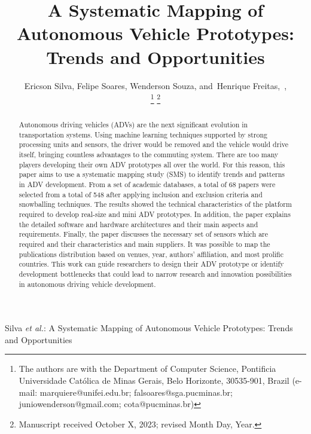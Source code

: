 \documentclass[lettersize,journal]{IEEEtran}
\begin{document}
\title{A Systematic Mapping of Autonomous Vehicle Prototypes: Trends and Opportunities}

\author{Ericson Silva,
        Felipe Soares,
        Wenderson Souza,
        and~Henrique Freitas,~,%

\thanks{The authors are with the Department of Computer Science, Pontificia Universidade Católica de Minas Gerais, Belo Horizonte,  30535-901, Brazil (e-mail: marquiere@unifei.edu.br; falsoares@sga.pucminas.br; juniowenderson@gmail.com; cota@pucminas.br)}%
\thanks{Manuscript received October X, 2023; revised Month Day, Year.}}


%
{Silva \MakeLowercase{\textit{et al.}}: A Systematic Mapping of Autonomous Vehicle Prototypes: Trends and Opportunities}


\maketitle

\begin{abstract}
Autonomous driving vehicles (ADVs) are the next significant evolution in transportation systems. Using machine learning techniques supported by strong processing units and sensors, the driver would be removed and the vehicle would drive itself, bringing countless advantages to the commuting system. There are too many players developing their own ADV prototypes all over the world. For this reason, this paper aims to use a systematic mapping study (SMS) to identify trends and patterns in ADV development. From a set of academic databases, a total of 68 papers were selected from a total of 548 after applying inclusion and exclusion criteria and snowballing techniques. The results showed the technical characteristics of the platform required to develop real-size and mini ADV prototypes. In addition, the paper explains the detailed software and hardware architectures and their main aspects and requirements. Finally, the paper discusses the necessary set of sensors which are required and their characteristics and main suppliers. It was possible to map the publications distribution based on venues, year, authors' affiliation, and most prolific countries. This work can guide researchers to design their ADV prototype or identify development bottlenecks that could lead to narrow research and innovation possibilities in autonomous driving vehicle development.

\end{abstract}
\end{document}
